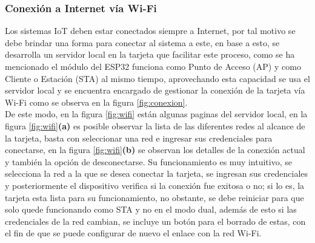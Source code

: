 \subsubsection{Conexión a Internet vía Wi-Fi}\label{sub:wifi}

Los sistemas IoT deben estar conectados siempre a Internet, por tal motivo se debe brindar una forma para conectar al sistema a este, en base a esto, se desarrolla un servidor local en la tarjeta que facilitar este proceso, como se ha mencionado el módulo del ESP32 funciona como Punto de Acceso (AP) y como Cliente o Estación (STA) al mismo tiempo, aprovechando esta capacidad se usa el servidor local y se encuentra encargado de gestionar la conexión de la tarjeta vía Wi-Fi como se observa en la figura \ref{fig:conexion}.\\



De este modo, en la figura \ref{fig:wifi} están algunas paginas del servidor local, en la figura \ref{fig:wifi}\textbf{(a)} es posible observar la lista de las diferentes redes al alcance de la tarjeta, basta con seleccionar una red e ingresar sus credenciales para conectarse, en la figura \ref{fig:wifi}\textbf{(b)} se observan los detalles de la conexión actual y también la opción de desconectarse. Su funcionamiento es muy intuitivo, se selecciona la red a la que se desea conectar la tarjeta, se ingresan sus credenciales y posteriormente el dispositivo verifica si la conexión fue exitosa o no; si lo es, la tarjeta esta lista para su funcionamiento, no obstante, se debe reiniciar para que solo quede funcionando como STA y no en el modo dual, además de esto si las credenciales de la red cambian, se incluye un botón para el borrado de estas, con el fin de que se puede configurar de nuevo el enlace con la red Wi-Fi.


